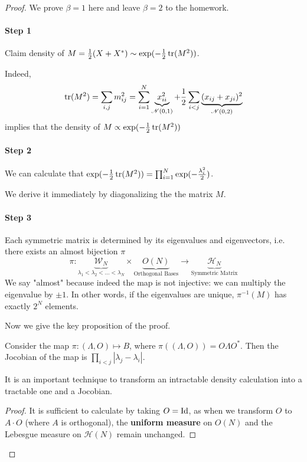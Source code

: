 \begin{proof}
    We prove $\beta = 1$ here and leave $\beta = 2$ to the homework.

    \paragraph{Step 1}  Claim density of $M = \frac{1}{2}(X+X^*) \sim \exp(-\frac{1}{2}\operatorname{tr}(M^2))$.

    Indeed, 
    \[
    \operatorname{tr}(M^2) = \sum_{i,j} m_{ij}^2 = \sum_{i=1}^N \underbrace{x_{ii}^2}_{\mathcal{N}(0,1)} + \frac{1}{2}\sum_{i<j} \underbrace{(x_{ij}+x_{ji})^2}_{\mathcal{N}(0,2)}
    \]
    implies that the density of $M\propto \exp(-\frac{1}{2}\operatorname{tr}(M^2))$

    \paragraph{Step 2}  We can calculate that $\exp(-\frac{1}{2}\operatorname{tr}(M^2)) = \prod_{i=1}^N \exp(-\frac{\lambda_i^2}{2})$.

    We derive it immediately by diagonalizing the the matrix $M$.

    \paragraph{Step 3}  Each symmetric matrix is determined by its eigenvalues and eigenvectors, i.e. there exists an almost bijection $\pi$
    \[
    \pi: \underbrace{\mathcal{W}_N}_{\lambda_1<\lambda_2<...<\lambda_N} \times \underbrace{O(N)}_{\text{Orthogonal Bases}} \to \underbrace{\mathcal{H}_N}_{\text{Symmetric Matrix}}
    \]
    We say "almost" because indeed the map is not injective: we can multiply the eigenvalue by $\pm 1$. In other words, if the eigenvalues are unique, $\pi^{-1}(M)$ has exactly $2^N$ elements.

    Now we give the key proposition of the proof.
    \begin{prop}[Jacobian]
        Consider the map $\pi: (\Lambda, O) \mapsto B$, where $\pi((\Lambda, O)) = O\Lambda O^*$. Then the Jocobian of the map is $\prod_{i<j} |\lambda_j-\lambda_i|$.
    \end{prop}
    \begin{rem}
        It is an important technique to transform an intractable density calculation into a tractable one and a Jocobian.
    \end{rem}
    \begin{proof}
        It is sufficient to calculate by taking $O = \operatorname{Id}$, as when we transform $O$ to $A\cdot O$ (where $A$ is orthogonal), the \textbf{uniform measure} on $O(N)$ and the Lebesgue measure on $\mathcal{H}(N)$ remain unchanged.


\end{proof}
\end{proof}
